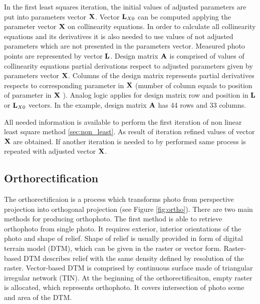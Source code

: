 \documentclass[a4paper,12pt]{article}
\newcommand{\ematr}[1]{
{\bf #1}
}
\newcommand{\evect}[1]{
{\bf #1}
}
\begin{document}
In the first least squares iteration, the initial values of adjusted parameters are put into parameters vector $\evect{X}$. 
Vector $\evect{L}_{X0}$ can be computed applying the parameter vector $\evect{X}$ on collinearity
equations. In order to calculate all collinearity equations and its derivatives it is also needed to 
use values of not adjusted parameters which are not presented in the parameters vector.
Measured photo points are represented by vector $\evect{L}$.
Design matrix $\ematr{A}$ is comprised of values of  collinearity equations partial derivations respect to adjusted parameters
given by parameters vector $\evect{X}$. Columns of the design matrix represents partial derivatives 
respects to corresponding parameter  in  $\evect{X}$  (mumber of column equals to position of parameter in  $\evect{X}$ ).
Analog logic applies for design matrix row and position in $\evect{L}$ or $\evect{L}_{X0}$ vectors.
In the example, design matrix $\ematr{A}$ has 44 rows and 33 columns.



All needed information is available to perform the first iteration of non linear least square 
method \ref{sec:non_least}. As result of iteration refined values of vector  $\evect{X}$
are obtained. If another iteration is needed to by performed same process is repeated 
with adjusted vector $\evect{X}$.

\subsection{Orthorectification}


The orthorectificaion is a process which transforms photo from perspective projection into orthogonal projection (see Figure \ref{fig:ortho}). 
\label{sec:single_ortho}
There are two main methods for producing orthophoto. The first method is able to retrieve orthophoto 
from single photo. It requires exterior, interior orientations of the photo and shape of relief. 
Shape of relief is usually provided in form of digital terrain model (DTM), which 
can be given in the raster or vector form. Raster-based DTM describes relief with the same density defined by resolution of the raster.
Vector-based DTM is comprised by continuous surface made of triangular irregular network (TIN). 
At the beginning of the orthorectificaiton, empty raster is allocated, which represents orthophoto.
It covers intersection of photo scene and area of the DTM.
\end{document}
